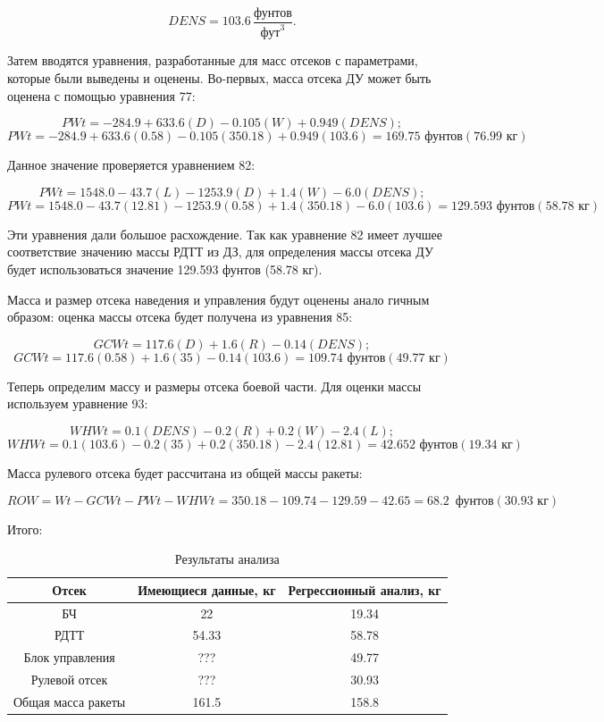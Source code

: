 \documentclass[a4paper,12pt]{report}
\begin{document}
\[ \textit{DENS} = 103.6 \, \frac{\text{фунтов}}{\text{фут}^3} . \]

Затем вводятся уравнения, разработанные для масс отсеков с параметрами, которые были выведены и оценены. Во-первых, масса отсека ДУ
может быть оценена с помощью уравнения 77:

\[ \textit{PWt} = -284.9 + 633.6(D) - 0.105(W) + 0.949(\textit{DENS}); \]
\[ \textit{PWt} = -284.9 + 633.6(0.58) - 0.105(350.18) + 0.949(103.6) = 169.75 \text{ фунтов}(76.99 \text{ кг})\]


Данное значение проверяется уравнением 82:

\[ \textit{PWt} = 1548.0 - 43.7(L) - 1253.9(D) + 1.4(W) - 6.0(\textit{DENS}); \]
\[ \textit{PWt} = 1548.0 - 43.7(12.81) - 1253.9(0.58) + 1.4(350.18) - 6.0(103.6) = 129.593 \text{ фунтов}(58.78 \text{ кг}) \]

Эти уравнения дали большое расхождение. Так как уравнение
82 имеет лучшее соответствие значению массы РДТТ из ДЗ, для определения
массы отсека ДУ будет использоваться значение 129.593 фунтов (58.78 кг).

 Масса и размер отсека наведения и управления будут оценены анало
гичным образом: оценка массы отсека будет получена из уравнения 85:

\[ GCWt = 117.6(D) + 1.6(R) - 0.14(\textit{DENS}); \]
\[ GCWt = 117.6(0.58) + 1.6(35) - 0.14(103.6) = 109.74 \text{ фунтов}( 49.77\text{ кг}) \]


Теперь определим массу и размеры отсека боевой части. Для оценки массы используем уравнение 93:

\[ WHWt = 0.1(DENS) - 0.2(R) + 0.2(W) - 2.4(L); \]
\[ WHWt = 0.1(103.6) - 0.2(35) + 0.2(350.18) - 2.4(12.81) = 42.652 \text{ фунтов}( 19.34\text{ кг}) \]


Масса рулевого отсека будет рассчитана из общей массы ракеты:

\[
ROW = Wt - GCWt - PWt - WHWt = 350.18 - 109.74 - 129.59 - 42.65 = 68.2 \, \text{ фунтов}( 30.93\text{ кг})
\]

Итого: 

\begin{table}[H]
\centering
\begin{tabular}{|c|c|c|}
\hline
\textbf{Отсек} & \textbf{Имеющиеся данные, кг} & \textbf{Регрессионный анализ, кг} \\
\hline
БЧ & 22 & 19.34 \\
\hline
РДТТ & 54.33 & 58.78 \\
\hline
Блок управления & ??? & 49.77 \\
\hline
Рулевой отсек & ??? & 30.93 \\
\hline
Общая масса ракеты & 161.5 & 158.8 \\
\hline
\end{tabular}
\caption{Результаты анализа}
\label{tab:three_columns}
\end{table}
\end{document}
